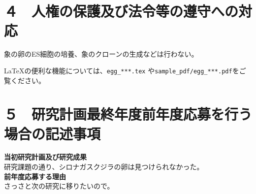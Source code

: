 \documentclass[11pt,a4j,dvipdfmx]{jarticle} 					%
\newcommand{\研究課題名}{象の卵}
\newcommand{\研究機関名}{逢坂大学}
\newcommand{\研究代表者氏名}{湯川秀樹}
\newcommand{\研究期間の最終元号年度}{7}  %
\begin{document}



\section{４　人権の保護及び法令等の遵守への対応}

	象の卵のES細胞の培養、象のクローンの生成などは行わない。

	\LaTeX の便利な機能については、\texttt{egg\_***.tex} や\texttt{sample\_pdf/egg\_***.pdf}をご覧ください。




\section{５　研究計画最終年度前年度応募を行う場合の記述事項}

\newcommand{\最終年度研究種目名}{基盤研究（Z）}
\newcommand{\最終年度研究課題番号}{99999}
\newcommand{\最終年度研究課題名}{シロナガスクジラの卵はなぜ見つけられないのか}
\newcommand{\最終年度研究期間}{平成25年度〜令和\一年目 年度}


\noindent
\textbf{当初研究計画及び研究成果}\\
	研究課題の通り、シロナガスクジラの卵は見つけられなかった。
\\

\noindent
\textbf{前年度応募する理由}\\
	さっさと次の研究に移りたいので。



\end{document}
